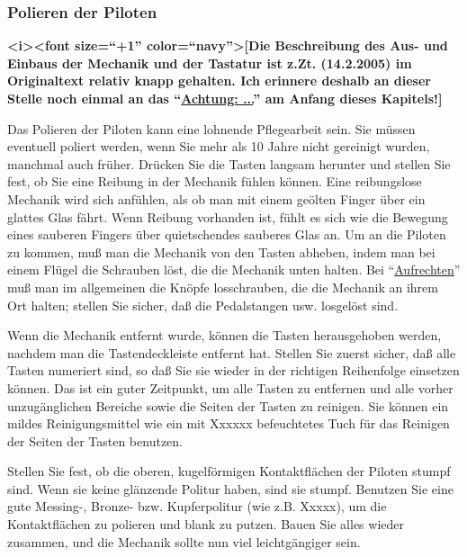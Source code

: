 {\label{c2_7b}
\subsubsection{Polieren der Piloten}
\label{c2_7_pilo} 

\textbf{<i><font size=\enquote{+1} color=\enquote{navy}>[Die Beschreibung des  Aus- und Einbaus der Mechanik und der Tastatur ist z.Zt. (14.2.2005) im Originaltext relativ knapp gehalten.
Ich erinnere deshalb an dieser Stelle noch einmal an das \enquote{\hyperref[c2_1]{Achtung: ...}} am Anfang dieses Kapitels!]}}

Das Polieren der Piloten kann eine lohnende Pflegearbeit sein.
Sie müssen eventuell poliert werden, wenn Sie mehr als 10 Jahre nicht gereinigt wurden, manchmal auch früher.
Drücken Sie die Tasten langsam herunter und stellen Sie fest, ob Sie eine Reibung in der Mechanik fühlen können.
Eine reibungslose Mechanik wird sich anfühlen, als ob man mit einem geölten Finger über ein glattes Glas fährt.
Wenn Reibung vorhanden ist, fühlt es sich wie die Bewegung eines sauberen Fingers über quietschendes sauberes Glas an.
Um an die Piloten zu kommen, muß man die Mechanik von den Tasten abheben, indem man bei einem Flügel die Schrauben löst, die die Mechanik unten halten.
Bei \enquote{\hyperref[upright]{Aufrechten}} muß man im allgemeinen die Knöpfe losschrauben, die die Mechanik an ihrem Ort halten; stellen Sie sicher, daß die Pedalstangen usw. losgelöst sind.

Wenn die Mechanik entfernt wurde, können die Tasten herausgehoben werden, nachdem man die Tastendeckleiste entfernt hat.
Stellen Sie zuerst sicher, daß alle Tasten numeriert sind, so daß Sie sie wieder in der richtigen Reihenfolge einsetzen können.
Das ist ein guter Zeitpunkt, um alle Tasten zu entfernen und alle vorher unzugänglichen Bereiche sowie die Seiten der Tasten zu reinigen.
Sie können ein mildes Reinigungsmittel wie ein mit Xxxxxx befeuchtetes Tuch für das Reinigen der Seiten der Tasten benutzen.

Stellen Sie fest, ob die oberen, kugelförmigen Kontaktflächen der Piloten stumpf sind.
Wenn sie keine glänzende Politur haben, sind sie stumpf.
Benutzen Sie eine gute Messing-, Bronze- bzw. Kupferpolitur (wie z.B. Xxxxx), um die Kontaktflächen zu polieren und blank zu putzen.
Bauen Sie alles wieder zusammen, und die Mechanik sollte nun viel leichtgängiger sein.
 




